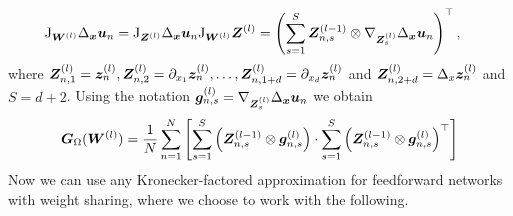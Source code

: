 \begin{align*}
    \jac_{\mW^{(l)}} \Delta_\vx \vu_n & = \jac_{\mZ^{(l)}}\Delta_\vx \vu_n \jac_{\mW^{(l)}} \mZ^{(l)} %
    = \left(\sum_{s=1}^S \mZ^{(l-1)}_{n,s} \otimes \nabla_{\mZ^{(l)}_s} \Delta_{\vx}\vu_n\right)^\top,
\end{align*}
where ${\bm{Z}}_{n, 1}^{(l)} = {\bm{z}}_n^{(l)}, {\bm{Z}}_{n, 2}^{(l)} = \partial_{x_1}{\bm{z}}_n^{(l)}, \dots, {\bm{Z}}_{n, 1+d}^{(l)} = \partial_{x_d}{\bm{z}}_n^{(l)}$ and ${\bm{Z}}_{n, 2+d}^{(l)} = \Delta_x{\bm{z}}_n^{(l)}$ and $S=d+2$.
Using the notation
${\bm{g}}_{n, s}^{(l)} = \nabla_{{\bm{Z}}_{s}^{(l)}} \Delta_{\bm{x}}{\bm{u}}_n$ we obtain
\begin{equation}\label{eq:laplace_gramian_block_exact}
    {\bm{G}}_\Omega({\bm{W}}^{(l)})
    =
    \frac1N\sum_{n=1}^N
    \left[\sum_{s=1}^S \left( {\bm{Z}}^{(l-1)}_{n,s}\otimes {\bm{g}}_{n,s}^{(l)} \right)
    \cdot
    \sum_{s=1}^S \left( {\bm{Z}}
    ^{(l-1)}_{n,s}\otimes {\bm{g}}_{n,s}^{(l)} \right)^\top\right]
\end{equation}
Now we can use any Kronecker-factored approximation for feedforward networks with weight sharing, where we choose to work with the following.

